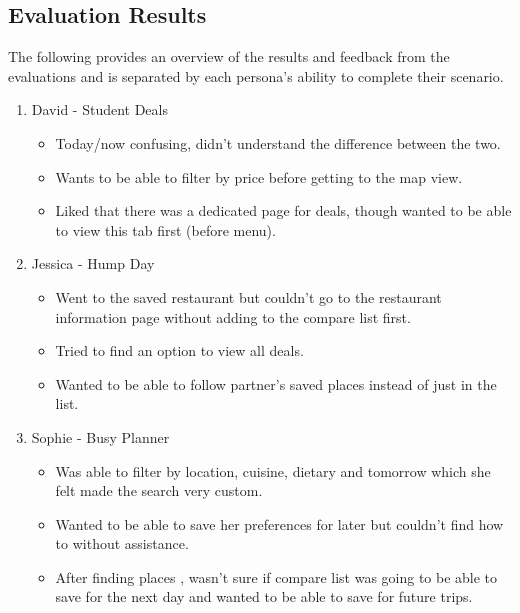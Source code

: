 \documentclass[a4 paper, 12pt]{article}
\begin{document}
    \subsection{Evaluation Results}
    The following provides an overview of the results and feedback from the evaluations and is separated by each persona's ability to complete their scenario. 
        \begin{enumerate}
            \item David - Student Deals
                \begin{itemize}
                    \item Today/now confusing, didn't understand the difference between the two.
                    \item Wants to be able to filter by price before getting to the map view.
                    \item Liked that there was a dedicated page for deals, though wanted to be able to view this tab first (before menu).
                \end{itemize}

            \item Jessica - Hump Day
                \begin{itemize}
                    \item Went to the saved restaurant but couldn't go to the restaurant information page without adding to the compare list first.
                    \item Tried to find an option to view all deals.
                    \item Wanted to be able to follow partner's saved places instead of just in the list. 
                \end{itemize}

            \item Sophie - Busy Planner
                \begin{itemize}             
                    \item Was able to filter by location, cuisine,  dietary and tomorrow which she felt made the search very custom.
                    \item Wanted to be able to save her preferences for later but couldn't find how to without assistance.
                    \item After finding places , wasn't sure if compare list was going to be able to save for the next day and wanted to be able to save for future trips. 
                \end{itemize}


\end{enumerate}
\end{document}
